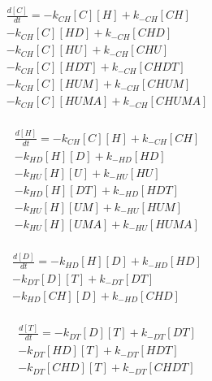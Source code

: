 \begin{equation}
\begin{split}
\frac{d[C]}{dt} =     - k_{CH}[C][H]    + k_{-CH}[CH]     \\%
                      - k_{CH}[C][HD]   + k_{-CH}[CHD]    \\%
                      - k_{CH}[C][HU]   + k_{-CH}[CHU]    \\%
                      - k_{CH}[C][HDT]  + k_{-CH}[CHDT]   \\%
                      - k_{CH}[C][HUM]  + k_{-CH}[CHUM]   \\%
                      - k_{CH}[C][HUMA] + k_{-CH}[CHUMA]  \\%
\end{split}
\end{equation}

\begin{equation}
\begin{split}
\frac{d[H]}{dt} =     - k_{CH}[C][H]    + k_{-CH}[CH]     \\%
                      - k_{HD}[H][D]    + k_{-HD}[HD]     \\%
                      - k_{HU}[H][U]    + k_{-HU}[HU]     \\%
                      - k_{HD}[H][DT]   + k_{-HD}[HDT]    \\%
                      - k_{HU}[H][UM]   + k_{-HU}[HUM]    \\%
                      - k_{HU}[H][UMA]  + k_{-HU}[HUMA]   \\%
\end{split}
\end{equation}

\begin{equation}
\begin{split}
\frac{d[D]}{dt} =     - k_{HD}[H][D]    + k_{-HD}[HD]     \\%
                      - k_{DT}[D][T]    + k_{-DT}[DT]     \\%
                      - k_{HD}[CH][D]   + k_{-HD}[CHD]    \\%
\end{split}
\end{equation}

\begin{equation}
\begin{split}
\frac{d[T]}{dt} =     - k_{DT}[D][T]    + k_{-DT}[DT]     \\%
                      - k_{DT}[HD][T]   + k_{-DT}[HDT]    \\%
                      - k_{DT}[CHD][T]  + k_{-DT}[CHDT]   \\%
\end{split}
\end{equation}

